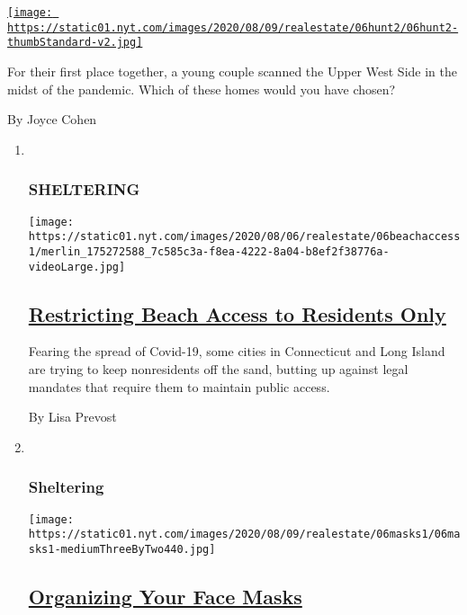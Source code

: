 \begin{enumerate}
\begin{enumerate}
    \href{/interactive/2020/08/06/realestate/06hunt-rogala.html}{\texttt{[image: https://static01.nyt.com/images/2020/08/09/realestate/06hunt2/06hunt2-thumbStandard-v2.jpg]}}

    For their first place together, a young couple scanned the Upper
    West Side in the midst of the pandemic. Which of these homes would
    you have chosen?

    By Joyce Cohen
  \end{enumerate}
\end{enumerate}

\begin{enumerate}
\def\labelenumi{\arabic{enumi}.}
\item ~
  \hypertarget{sheltering}{%
  \subsubsection{SHELTERING}\label{sheltering}}

  \texttt{[image: https://static01.nyt.com/images/2020/08/06/realestate/06beachaccess1/merlin\_175272588\_7c585c3a-f8ea-4222-8a04-b8ef2f38776a-videoLarge.jpg]}

  \hypertarget{restricting-beach-access-to-residents-only}{%
  \subsection{\texorpdfstring{\href{/2020/08/06/realestate/connecticut-long-island-beach-restrictions.html}{Restricting
  Beach Access to Residents
  Only}}{Restricting Beach Access to Residents Only}}\label{restricting-beach-access-to-residents-only}}

  Fearing the spread of Covid-19, some cities in Connecticut and Long
  Island are trying to keep nonresidents off the sand, butting up
  against legal mandates that require them to maintain public access.

  By Lisa Prevost
\item ~
  \hypertarget{sheltering-1}{%
  \subsubsection{Sheltering}\label{sheltering-1}}

  \texttt{[image: https://static01.nyt.com/images/2020/08/09/realestate/06masks1/06masks1-mediumThreeByTwo440.jpg]}

  \hypertarget{organizing-your-face-masks}{%
  \subsection{\texorpdfstring{\href{/2020/08/06/realestate/coronavirus-face-mask-organizers.html}{Organizing
  Your Face
  Masks}}{Organizing Your Face Masks}}\label{organizing-your-face-masks}}


\end{enumerate}
